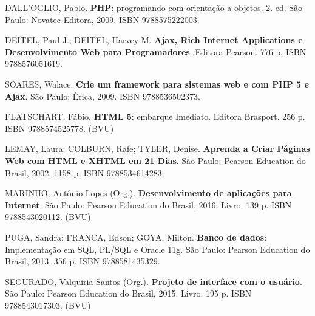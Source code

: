 \begin{pud}
	\begin{bibbasica}
			
        \item DALL'OGLIO, Pablo. \textbf{PHP}: programando com orientação a objetos. 2. ed. São Paulo: Novatec Editora, 2009.  ISBN 9788575222003.
		\item DEITEL, Paul J.; DEITEL, Harvey M.  \textbf{Ajax, Rich Internet Applications e Desenvolvimento Web para Programadores}. Editora Pearson. 776 p. ISBN 9788576051619. 
		\item SOARES, Walace. \textbf{Crie um framework para sistemas web e com PHP 5 e Ajax}. São Paulo: Érica, 2009.  ISBN 9788536502373.
		
	\end{bibbasica}
	
	\begin{bibcomplementar}
    
	    
		\item FLATSCHART, F\'abio. \textbf{HTML 5}: embarque Imediato. Editora Brasport. 256 p. ISBN 9788574525778. (BVU)
		\item LEMAY, Laura; COLBURN, Rafe; TYLER, Denise. \textbf{Aprenda a Criar P\'aginas Web com HTML e XHTML em 21 Dias}. São Paulo: Pearson Education do Brasil, 2002.  1158 p. ISBN 9788534614283.  
 		\item MARINHO, Antônio Lopes (Org.). \textbf{Desenvolvimento de aplicações para Internet}. São Paulo: Pearson Education do Brasil, 2016. Livro. 139 p. ISBN 9788543020112. (BVU)
 		
 		\item PUGA, Sandra; FRANCA, Edson; GOYA, Milton. \textbf{Banco de dados}: Implementa\c{c}\~ao em SQL, PL/SQL e Oracle 11g.  São Paulo: Pearson Education do Brasil, 2013. 356 p.  ISBN 9788581435329.  
 		\item SEGURADO, Valquiria Santos (Org.). \textbf{Projeto de interface com o usuário}. São Paulo: Pearson Education do Brasil, 2015. Livro. 195 p. ISBN 9788543017303. (BVU) 
		 
	\end{bibcomplementar}
	

\end{pud}





